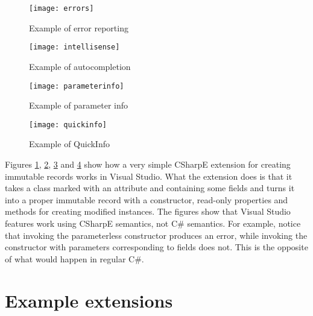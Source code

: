 \medskip

\begin{figure}[p]
\centering
\texttt{[image: errors]}
\caption{Example of error reporting}
\label{figure-errors}
\end{figure}

\begin{figure}[p]
\centering
\texttt{[image: intellisense]}
\caption{Example of autocompletion}
\label{figure-intellisense}
\end{figure}

\begin{figure}[p]
\centering
\texttt{[image: parameterinfo]}
\caption{Example of parameter info}
\label{figure-parameterinfo}
\end{figure}

\begin{figure}[p]
\centering
\texttt{[image: quickinfo]}
\caption{Example of QuickInfo}
\label{figure-quickinfo}
\end{figure}

Figures \ref{figure-errors}, \ref{figure-intellisense}, \ref{figure-parameterinfo} and \ref{figure-quickinfo} show how a very simple CSharpE extension for creating immutable records works in Visual Studio. What the extension does is that it takes a class marked with an attribute and containing some fields and turns it into a proper immutable record with a constructor, read-only properties and  methods for creating modified instances. The figures show that Visual Studio features work using CSharpE semantics, not C\# semantics. For example, notice that invoking the parameterless constructor produces an error, while invoking the constructor with parameters corresponding to fields does not. This is the opposite of what would happen in regular C\#.

\medskip


\section{Example extensions}
